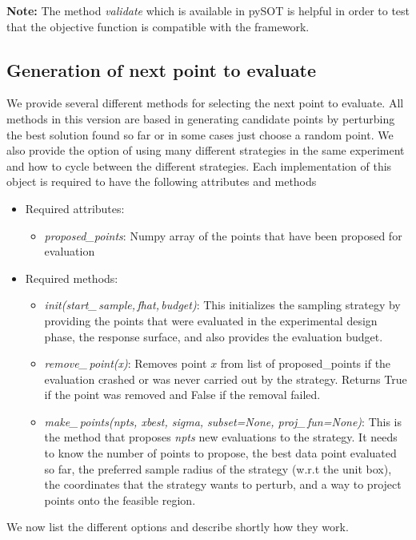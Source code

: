 \documentclass[]{article}
\begin{document}
\textbf{Note:} The method \textit{validate} which is available in pySOT is helpful in order to test that the objective function is compatible with the framework. \newline

\subsection{Generation of next point to evaluate} 
\label{search}
We provide several different methods for selecting the next point to evaluate. All methods in this version are based in generating candidate points by perturbing the best solution found so far or in some cases just choose a random point. We also provide the option of using many different strategies in the same experiment and how to cycle between the different strategies. Each implementation of this object is required to have the following attributes and methods
\begin{itemize}
\item[] {Required attributes}:
\begin{itemize}
\item \textit{proposed\_points}: Numpy array of the points that have been proposed for evaluation
\end{itemize}
\item[] {Required methods}:
\begin{itemize}
\item \textit{init(start\_\,sample,\,fhat,\,budget)}: This initializes the sampling strategy by providing the points that were evaluated in the experimental design phase, the response surface, and also provides  the evaluation budget.
\item \textit{remove\_\,point(x)}: Removes point $x$ from list of proposed\_points if the evaluation crashed or was never carried out by the strategy. Returns True if the point was removed and False if the removal failed.
\item \textit{make\_\,points(npts, xbest, sigma, subset=None, proj\_\,fun=None)}: This is the method that proposes \textit{npts} new evaluations to the strategy. It needs to know the number of points to propose, the best data point evaluated so far, the preferred sample radius of the strategy (w.r.t the unit box), the coordinates that the strategy wants to perturb, and a way to project points onto the feasible region. 
\end{itemize}
\end{itemize}
We now list the different options and describe shortly how they work.
\end{document}
